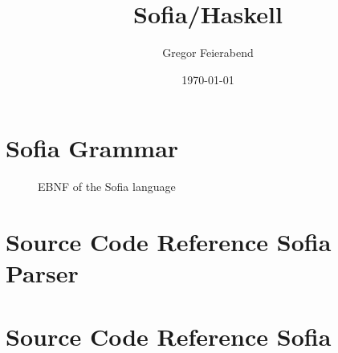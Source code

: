 \documentclass[notitlepage]{report}
\title{Sofia/Haskell}
\author{Gregor Feierabend}
\date{\today}
\begin{document}

\maketitle

\begingroup
\let\clearpage\relax
\tableofcontents
\endgroup


\chapter{Sofia Grammar}
\begin{figure}[h!]
	
	\caption{EBNF of the Sofia language}
\end{figure}

\chapter{Source Code Reference Sofia Parser}


\chapter{Source Code Reference Sofia}

\end{document}
